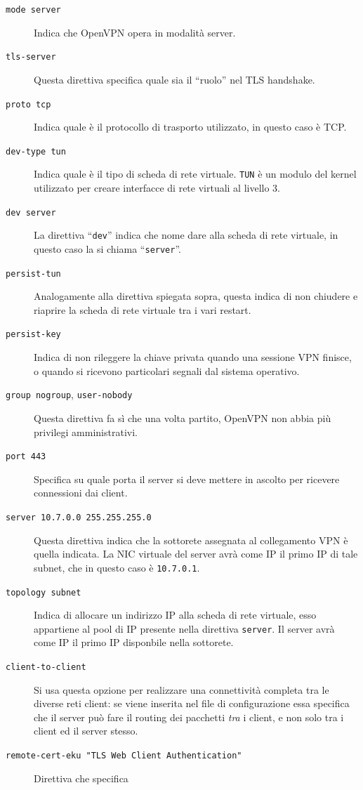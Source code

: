 \begin{description}
	\item[\texttt{mode server}]Indica che OpenVPN opera in modalità server.
	\item[\texttt{tls-server}]Questa direttiva specifica quale sia il ``ruolo'' nel TLS
	handshake.
	\item[\texttt{proto tcp}]Indica quale è il protocollo di trasporto utilizzato,
	in questo caso è TCP.
	\item[\texttt{dev-type tun}]Indica quale è il tipo di scheda di rete virtuale.
	\texttt{TUN} è un modulo del kernel utilizzato per creare interfacce di rete virtuali
	al livello 3.
	\item[\texttt{dev server}]La direttiva ``\texttt{dev}'' indica che nome dare
	alla scheda di rete virtuale, in questo caso la si chiama ``\texttt{server}''.
	\item[\texttt{persist-tun}]Analogamente alla direttiva spiegata sopra, questa
	indica di non chiudere e riaprire la scheda di rete virtuale tra i vari restart.
	\item[\texttt{persist-key}]Indica di non rileggere la chiave privata quando una
	sessione VPN finisce, o quando si ricevono particolari segnali dal sistema operativo.
	\item[\texttt{group nogroup}, \texttt{user-nobody}]Questa direttiva fa
	sì che una volta partito, OpenVPN
	non abbia più privilegi amministrativi.
	\item[\texttt{port 443}]Specifica su quale porta il server si deve mettere in ascolto per
	ricevere connessioni dai client.
	\item[\texttt{server 10.7.0.0 255.255.255.0}]Questa direttiva indica che la sottorete
	assegnata al collegamento VPN è quella indicata. La NIC virtuale del server
	avrà come IP il primo IP di tale subnet, che in questo caso è \texttt{10.7.0.1}.
	\item[\texttt{topology subnet}]Indica di allocare un indirizzo IP alla scheda
	di rete virtuale, esso appartiene al pool di IP presente nella direttiva \texttt{server}.
	Il server avrà come IP il primo IP disponbile nella sottorete.
	\item[\texttt{client-to-client}]Si usa questa opzione per realizzare una connettività
	completa tra le diverse reti client: se viene inserita nel file di configurazione essa
	specifica che il server può fare il routing dei pacchetti \textit{tra} i client, e non
	solo tra i client ed il server stesso.
	\item[\texttt{remote-cert-eku "TLS Web Client Authentication"}]Direttiva che specifica

\end{description}
